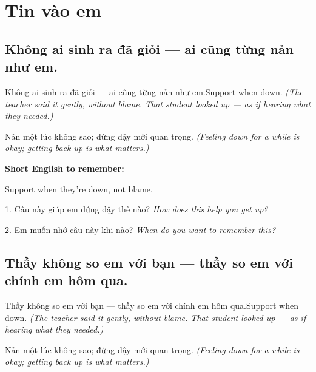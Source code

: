 \chapter{Tin vào em}


\section{Không ai sinh ra đã giỏi — ai cũng từng nản như em.}
\begin{truyen}{Không ai sinh ra đã giỏi — ai cũng từng nản như em.}{Support when down.}
\textit{(The teacher said it gently, without blame. That student looked up — as if hearing what they needed.)}
\end{truyen}

\begin{baihoc}
Nản một lúc không sao; đứng dậy mới quan trọng.
\textit{(Feeling down for a while is okay; getting back up is what matters.)}
\end{baihoc}

\begin{ghinhoanh}
\textbf{Short English to remember:}

Support when they're down, not blame.

\end{ghinhoanh}

\begin{tuhocnhanh}
1. Câu này giúp em đứng dậy thế nào? \textit{How does this help you get up?}

2. Em muốn nhớ câu này khi nào? \textit{When do you want to remember this?}
\end{tuhocnhanh}
\ngancach


\section{Thầy không so em với bạn — thầy so em với chính em hôm qua.}
\begin{truyen}{Thầy không so em với bạn — thầy so em với chính em hôm qua.}{Support when down.}
\textit{(The teacher said it gently, without blame. That student looked up — as if hearing what they needed.)}
\end{truyen}

\begin{baihoc}
Nản một lúc không sao; đứng dậy mới quan trọng.
\textit{(Feeling down for a while is okay; getting back up is what matters.)}
\end{baihoc}

